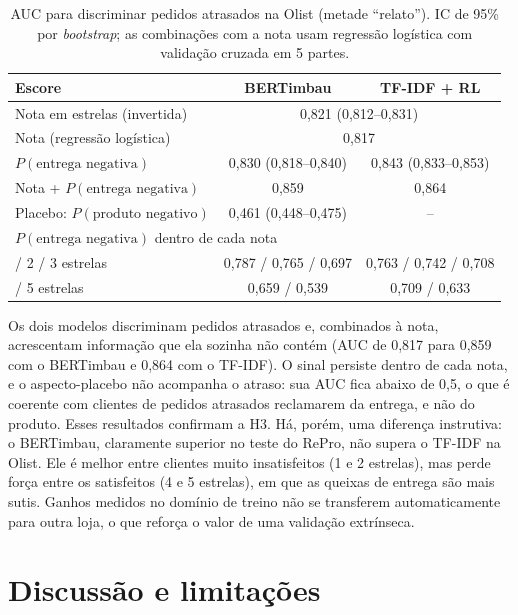 \documentclass[12pt,a4paper]{article}
\begin{document}
\begin{table}[ht]
\centering
\caption{AUC para discriminar pedidos atrasados na Olist (metade ``relato''). IC de 95\% por \emph{bootstrap}; as combinações com a nota usam regressão logística com validação cruzada em 5 partes.}
\label{tab:atraso}
\begin{tabular}{lcc}
\toprule
Escore & BERTimbau & TF-IDF + RL \\
\midrule
Nota em estrelas (invertida)            & \multicolumn{2}{c}{0,821 (0,812--0,831)} \\
Nota (regressão logística)              & \multicolumn{2}{c}{0,817} \\
$P(\text{entrega negativa})$            & 0,830 (0,818--0,840) & 0,843 (0,833--0,853) \\
Nota + $P(\text{entrega negativa})$     & 0,859 & 0,864 \\
Placebo: $P(\text{produto negativo})$   & 0,461 (0,448--0,475) & -- \\
\midrule
\multicolumn{3}{l}{$P(\text{entrega negativa})$ dentro de cada nota} \\
\quad 1 / 2 / 3 estrelas & 0,787 / 0,765 / 0,697 & 0,763 / 0,742 / 0,708 \\
\quad 4 / 5 estrelas     & 0,659 / 0,539         & 0,709 / 0,633 \\
\bottomrule
\end{tabular}
\end{table}

Os dois modelos discriminam pedidos atrasados e, combinados à nota, acrescentam informação que ela sozinha não contém (AUC de 0,817 para 0,859 com o BERTimbau e 0,864 com o TF-IDF). O sinal persiste dentro de cada nota, e o aspecto-placebo não acompanha o atraso: sua AUC fica abaixo de 0,5, o que é coerente com clientes de pedidos atrasados reclamarem da entrega, e não do produto. Esses resultados confirmam a H3. Há, porém, uma diferença instrutiva: o BERTimbau, claramente superior no teste do RePro, não supera o TF-IDF na Olist. Ele é melhor entre clientes muito insatisfeitos (1 e 2 estrelas), mas perde força entre os satisfeitos (4 e 5 estrelas), em que as queixas de entrega são mais sutis. Ganhos medidos no domínio de treino não se transferem automaticamente para outra loja, o que reforça o valor de uma validação extrínseca.

\section{Discussão e limitações}
\end{document}
